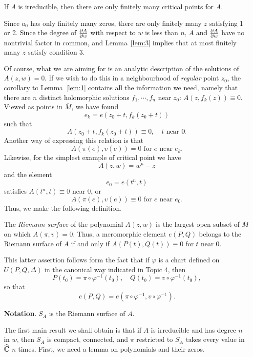 \documentclass[a4paper,11pt]{article}
\begin{document}
\begin{propn}
  \label{propn:1}
  If $A$ is irreducible, then there are only finitely many critical
  points for $A$.
\end{propn}

\begin{myproof}
  Since $a_0$ has only finitely many zeros, there are only finitely
  many $z$ satisfying 1 or 2.  Since the degree of $\frac{\partial A}{\partial w}$
  with respect to $w$ is less than $n$, $A$ and $\frac{\partial A}{\partial w}$
  have no nontrivial factor in common, and Lemma~\ref{lem:3} implies
  that at most finitely many $z$ satisfy condition 3.
\end{myproof}

Of course, what we are aiming for is an analytic description of the
solutions of $A(z,w) = 0$.  If we wish to do this in a neighbourhood
of \emph{regular} point $z_0$, the corollary to Lemma~\ref{lem:1}
contains all the information we need, namely that there are $n$
distinct holomorphic solutions $f_1, \cdots, f_n$ near $z_0$:
$A(z,f_k(z)) \equiv 0$.  Viewed as points in $\overline{M}$, we have
found
$$
e_k = e(z_0 + t, f_k(z_0 + t))
$$
such that
$$
A(z_0 + t, f_k(z_0 + t)) \equiv 0, \quad t\text{ near }0.
$$
Another way of expressing this relation is that
$$
A(\pi(e), v(e)) = 0\text{ for }e\text{ near }e_k.
$$
Likewise, for the simplest example of critical point we have
$$
A(z,w) = w^n - z
$$
and the element
$$
e_0 = e(t^n,t)
$$
satisfies $A(t^n, t) \equiv 0$ near 0, or
$$
A(\pi(e), v(e)) \equiv 0 \text{ for } e \text{ near } e_0.
$$
Thus, we make the following definition.

\begin{defn}
  \label{def:2}
  The \emph{Riemann surface} of the polynomial $A(z,w)$ is the largest
  open subset of $\overline{M}$ on which $A(\pi,v) = 0$.  Thus, a
  meromorphic element $e(P,Q)$ belongs to the Riemann surface of $A$
  if and only if $A(P(t),Q(t)) \equiv 0$ for $t$ near 0.
\end{defn}

This latter assertion follows form the fact that if $\varphi$ is a
chart defined on $U(P,Q,\Delta)$ in the canonical way indicated in
Topic 4, then
$$
P(t_0) = \pi \circ \varphi^{-1}(t_0),\quad
Q(t_0) = v \circ \varphi^{-1}(t_0),
$$
so that
$$
e(P,Q) = e(\pi \circ \varphi^{-1}, v \circ \varphi^{-1}).
$$

\textbf{Notation}.  $S_A$ is the Riemann surface of $A$.

The first main result we shall obtain is that if $A$ is irreducible
and has degree $n$ in $w$, then $S_A$ is compact, connected, and $\pi$
restricted to $S_A$ takes every value in $\widehat{{\mathbb C}}$ $n$ times.
First, we need a lemma on polynomials and their zeros.
\end{document}
